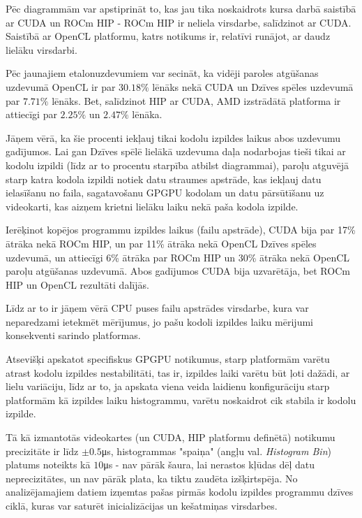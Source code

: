 Pēc diagrammām var apstiprināt to, kas jau tika noskaidrots kursa darbā
saistībā ar CUDA un ROCm HIP - ROCm HIP ir neliela virsdarbe, salīdzinot ar
CUDA.\cite{kursa-darbs} Saistībā ar OpenCL platformu, katrs notikums ir,
relatīvi runājot, ar daudz lielāku virsdarbi.

Pēc jaunajiem etalonuzdevumiem var secināt, ka vidēji paroles atgūšanas
uzdevumā OpenCL ir par \(30.18\%\) lēnāks nekā CUDA un Dzīves spēles uzdevumā
par \(7.71\%\) lēnāks. Bet, salīdzinot HIP ar CUDA, AMD izstrādātā platforma ir
attiecīgi par \(2.25\%\) un \(2.47\%\) lēnāka.

Jāņem vērā, ka šie procenti iekļauj tikai kodolu izpildes laikus abos uzdevumu
gadījumos. Lai gan Dzīves spēlē lielākā uzdevuma daļa nodarbojas tieši tikai ar
kodolu izpildi (līdz ar to procentu starpība atbilst diagrammai), paroļu
atguvējā starp katra kodola izpildi notiek datu straumes apstrāde, kas iekļauj
datu ielasīšanu no faila, sagatavošanu GPGPU kodolam un datu pārsūtīšanu uz
videokarti, kas aizņem krietni lielāku laiku nekā paša kodola izpilde.

Ierēķinot kopējos programmu izpildes laikus (failu apstrāde), CUDA bija par
17\% ātrāka nekā ROCm HIP, un par 11\% ātrāka nekā OpenCL Dzīves spēles
uzdevumā, un attiecīgi 6\% ātrāka par ROCm HIP un 30\% ātrāka nekā OpenCL
paroļu atgūšanas uzdevumā. Abos gadījumos CUDA bija uzvarētāja, bet ROCm HIP un
OpenCL rezultāti dalījās.

Līdz ar to ir jāņem vērā CPU puses failu apstrādes virsdarbe, kura var
neparedzami ietekmēt mērījumus, jo pašu kodoli izpildes laiku mērijumi
konsekventi sarindo platformas.

Atsevišķi apskatot specifiskus GPGPU notikumus, starp platformām varētu atrast
kodolu izpildes nestabilitāti, tas ir, izpildes laiki varētu būt ļoti dažādi,
ar lielu variāciju, līdz ar to, ja apskata viena veida laidienu konfigurāciju
starp platformām kā izpildes laiku histogrammu, varētu noskaidrot cik stabila
ir kodolu izpilde.

Tā kā izmantotās videokartes (un CUDA, HIP platformu definētā) notikumu
precizitāte ir līdz \(\pm0.5\)\si{\micro\second}, histogrammas "spaiņa" (angļu
val. \textit{Histogram Bin}) platums noteikts kā \(10\)\si{\micro\second} - nav
pārāk šaura, lai nerastos kļūdas dēļ datu neprecizitātes, un nav pārāk plata, 
ka tiktu zaudēta izšķirtspēja. \cite{Freedman1981} No analizējamajiem datiem
izņemtas pašas pirmās kodolu izpildes programmu dzīves ciklā, kuras var saturēt
inicializācijas un kešatmiņas virsdarbes.

